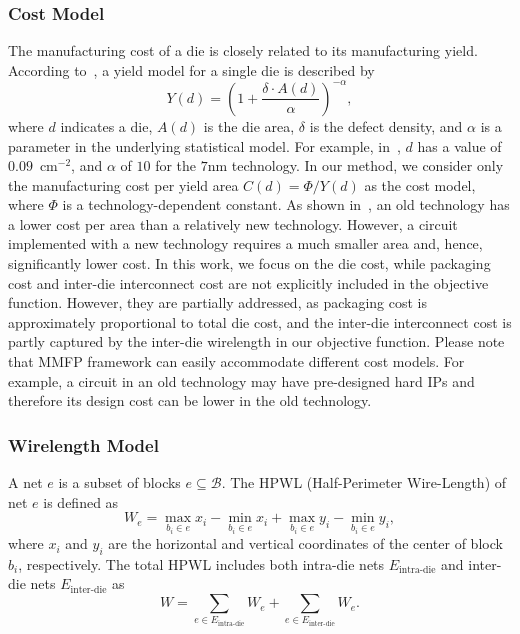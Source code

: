 \subsubsection{Cost Model}
\label{sec:cost_model}
The manufacturing cost of a die is closely related to its manufacturing yield. According to~\cite{feng2022costModel,cunningham1990costModel}, a yield model for a single die is described by
\begin{equation}
  Y(d) = \left(1+ \frac{\delta\cdot A(d)}{\alpha} \right)^{-\alpha},
\end{equation}
where $d$ indicates a die, $A(d)$ is the die area, $\delta$ is the defect density, and $\alpha$ is a parameter in the underlying statistical model. For example, in~\cite{feng2022costModel}, $d$ has a value of $0.09$~cm$^{-2}$, and $\alpha$ of $10$ for the $7$nm technology. In our method, we consider only the manufacturing cost per yield area $C(d){=}\Phi/Y(d)$ as the cost model, where $\Phi$ is a technology-dependent constant. As shown in~\cite{feng2022costModel}, an old technology has a lower cost per area than a relatively new technology. However, a circuit implemented with a new technology requires a much smaller area and, hence, significantly lower cost.
In this work, we focus on the die cost, while packaging cost
and inter-die interconnect cost are not explicitly included in the objective function. However, they are partially addressed, as packaging cost is approximately proportional to total die cost, and the inter-die interconnect cost is partly captured by the inter-die wirelength in our objective function. Please note that MMFP framework can easily accommodate different cost models. For example, a circuit in an old technology may have pre-designed hard IPs and therefore its design cost can be lower in the old technology.


\subsubsection{Wirelength Model}
A net $e$ is a subset of blocks $e\subseteq \mathcal{B}$.
The HPWL (Half-Perimeter Wire-Length) of net $e$ is defined as
\begin{equation}
  W_e = \max_{b_i \in e}{x_i}-\min_{b_i \in e}{x_i} + \max_{b_i \in e}{y_i}-\min_{b_i \in e}{y_i},
\end{equation}
where $x_i$ and $y_i$ are the horizontal and vertical coordinates of the center of block $b_i$, respectively. The total HPWL includes both intra-die nets $E_\text{intra-die}$ and inter-die nets $E_\text{inter-die}$ as
\begin{equation*}
  W =\sum_{e \in E_\text{intra-die}} W_e + \sum_{e \in  E_\text{inter-die}} W_e.
\end{equation*}
